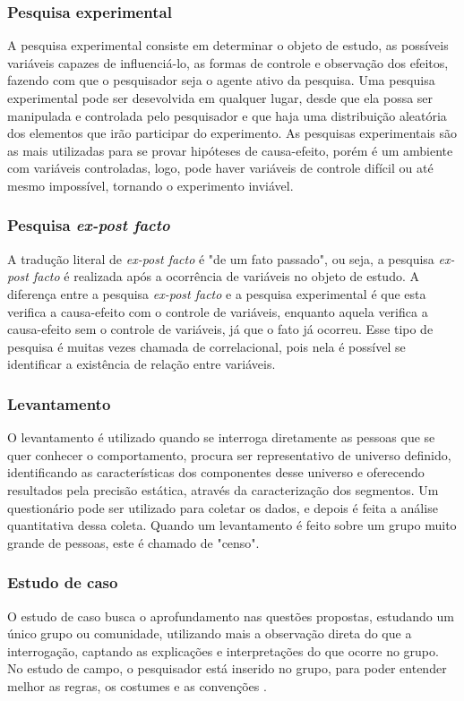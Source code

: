 \subsubsection{Pesquisa experimental}
	A pesquisa experimental consiste em determinar o objeto de estudo, as possíveis variáveis capazes de influenciá-lo, as formas de controle e observação dos efeitos, fazendo com que o pesquisador seja o agente ativo da pesquisa. Uma pesquisa experimental pode ser desevolvida em qualquer lugar, desde que ela possa ser manipulada e controlada pelo pesquisador e que haja uma distribuição aleatória dos elementos que irão participar do experimento. As pesquisas experimentais são as mais utilizadas para se provar hipóteses de causa-efeito, porém é um ambiente com variáveis controladas, logo, pode haver variáveis de controle difícil ou até mesmo impossível, tornando o experimento inviável. \cite{ac2002elaborar}
\subsubsection{Pesquisa \textit{ex-post facto}}
	A tradução literal de \textit{ex-post facto} é "de um fato passado", ou seja, a pesquisa \textit{ex-post facto} é realizada após a ocorrência de variáveis no objeto de estudo. A diferença entre a pesquisa \textit{ex-post facto} e a pesquisa experimental é que esta verifica a causa-efeito com o controle de variáveis, enquanto aquela verifica a causa-efeito sem o controle de variáveis, já que o fato já ocorreu. Esse tipo de pesquisa é muitas vezes chamada de correlacional, pois nela é possível se identificar a existência de relação entre variáveis. \cite{ac2002elaborar}
\subsubsection{Levantamento}
	O levantamento é utilizado quando se interroga diretamente as pessoas que se quer conhecer o comportamento, procura ser representativo de universo definido, identificando as características dos componentes desse universo e oferecendo resultados pela precisão estática, através da caracterização dos segmentos. Um questionário pode ser utilizado para coletar os dados, e depois é feita a análise quantitativa dessa coleta. Quando um levantamento é feito sobre um grupo muito grande de pessoas, este é chamado de "censo". \cite{prodanov2013metodologia} 	
\subsubsection{Estudo de caso}
		O estudo de caso busca o aprofundamento nas questões propostas, estudando um único grupo ou comunidade, utilizando mais a observação direta do que a interrogação, captando as explicações e interpretações do que ocorre no grupo. No estudo de campo, o pesquisador está inserido no grupo, para poder entender melhor as regras, os costumes e as convenções \cite{ventura2007estudo}.

